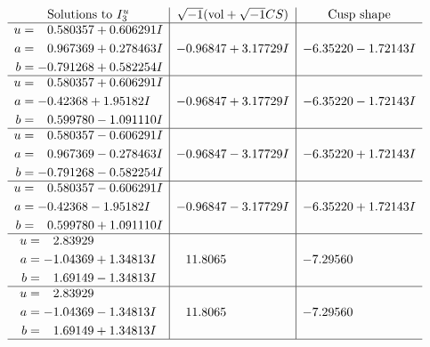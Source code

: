 \documentclass[1p]{elsarticle_modified}
\theoremstyle{definition}
\newcommand{\I}{\sqrt{-1}}
\begin{document}
$$\begin{array}{c|c|c}  
\text{Solutions to }I^u_{3}& \I (\text{vol} + \sqrt{-1}CS) & \text{Cusp shape}\\
 \hline 
\begin{aligned}
u &= \phantom{-}0.580357 + 0.606291 I \\
a &= \phantom{-}0.967369 + 0.278463 I \\
b &= -0.791268 + 0.582254 I\end{aligned}
 & -0.96847 + 3.17729 I & -6.35220 - 1.72143 I \\ \hline\begin{aligned}
u &= \phantom{-}0.580357 + 0.606291 I \\
a &= -0.42368 + 1.95182 I \\
b &= \phantom{-}0.599780 - 1.091110 I\end{aligned}
 & -0.96847 + 3.17729 I & -6.35220 - 1.72143 I \\ \hline\begin{aligned}
u &= \phantom{-}0.580357 - 0.606291 I \\
a &= \phantom{-}0.967369 - 0.278463 I \\
b &= -0.791268 - 0.582254 I\end{aligned}
 & -0.96847 - 3.17729 I & -6.35220 + 1.72143 I \\ \hline\begin{aligned}
u &= \phantom{-}0.580357 - 0.606291 I \\
a &= -0.42368 - 1.95182 I \\
b &= \phantom{-}0.599780 + 1.091110 I\end{aligned}
 & -0.96847 - 3.17729 I & -6.35220 + 1.72143 I \\ \hline\begin{aligned}
u &= \phantom{-}2.83929\phantom{ +0.000000I} \\
a &= -1.04369 + 1.34813 I \\
b &= \phantom{-}1.69149 - 1.34813 I\end{aligned}
 & \phantom{-}11.8065\phantom{ +0.000000I} & -7.29560\phantom{ +0.000000I} \\ \hline\begin{aligned}
u &= \phantom{-}2.83929\phantom{ +0.000000I} \\
a &= -1.04369 - 1.34813 I \\
b &= \phantom{-}1.69149 + 1.34813 I\end{aligned}
 & \phantom{-}11.8065\phantom{ +0.000000I} & -7.29560\phantom{ +0.000000I}\\
 \hline 
 \end{array}$$\newpage\newpage\renewcommand{\arraystretch}{1}
\end{document}
